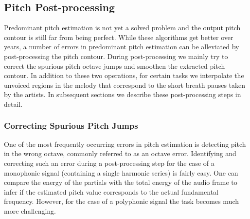{{

\subsection{Pitch Post-processing}
\label{sec:data_preprocessing_pitch_postprocessing}

Predominant pitch estimation is not yet a solved problem and the output pitch contour is still far from being perfect. While these algorithms get better over years, a number of errors in predominant pitch estimation can be alleviated by post-processing the pitch contour. During post-processing we mainly try to correct the spurious pitch octave jumps and smoothen the extracted pitch contour. In addition to these two operations, for certain tasks we interpolate the unvoiced regions in the melody that correspond to the short breath pauses taken by the artists. In subsequent sections we describe these post-processing steps in detail.


\subsubsection{Correcting Spurious Pitch Jumps}
\label{sec:data_processing_correcting_pitch_jumps}

One of the most frequently occurring errors in pitch estimation is detecting pitch in the wrong octave, commonly referred to as an octave error. Identifying and correcting such an error during a post-processing step for the case of a monophonic signal (containing a single harmonic series) is fairly easy. One can compare the energy of the partials with the total energy of the audio frame to infer if the estimated pitch value corresponds to the actual fundamental frequency. However, for the case of a polyphonic signal the task becomes much more challenging. 


}}
